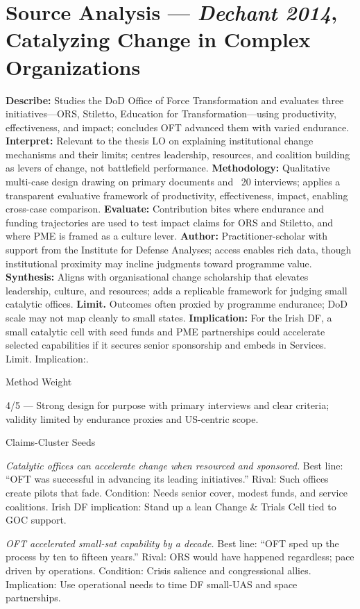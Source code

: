 \section*{Source Analysis — \textit{Dechant 2014}, Catalyzing Change in Complex Organizations}
\textbf{Describe:} Studies the DoD Office of Force Transformation and evaluates three initiatives—ORS, Stiletto, Education for Transformation—using productivity, effectiveness, and impact; concludes OFT advanced them with varied endurance.
\textbf{Interpret:} Relevant to the thesis LO on explaining institutional change mechanisms and their limits; centres leadership, resources, and coalition building as levers of change, not battlefield performance.
\textbf{Methodology:} Qualitative multi-case design drawing on primary documents and ~20 interviews; applies a transparent evaluative framework of productivity, effectiveness, impact, enabling cross-case comparison.
\textbf{Evaluate:} Contribution bites where endurance and funding trajectories are used to test impact claims for ORS and Stiletto, and where PME is framed as a culture lever.
\textbf{Author:} Practitioner-scholar with support from the Institute for Defense Analyses; access enables rich data, though institutional proximity may incline judgments toward programme value.
\textbf{Synthesis:} Aligns with organisational change scholarship that elevates leadership, culture, and resources; adds a replicable framework for judging small catalytic offices.
\textbf{Limit.} Outcomes often proxied by programme endurance; DoD scale may not map cleanly to small states.
\textbf{Implication:} For the Irish DF, a small catalytic cell with seed funds and PME partnerships could accelerate selected capabilities if it secures senior sponsorship and embeds in Services. Limit. Implication:.

Method Weight

4/5 — Strong design for purpose with primary interviews and clear criteria; validity limited by endurance proxies and US-centric scope.

Claims-Cluster Seeds

\textit{Catalytic offices can accelerate change when resourced and sponsored.} Best line: “OFT was successful in advancing its leading initiatives.” Rival: Such offices create pilots that fade. Condition: Needs senior cover, modest funds, and service coalitions. Irish DF implication: Stand up a lean Change & Trials Cell tied to GOC support.

\textit{OFT accelerated small-sat capability by a decade.} Best line: “OFT sped up the process by ten to fifteen years.” Rival: ORS would have happened regardless; pace driven by operations. Condition: Crisis salience and congressional allies. Implication: Use operational needs to time DF small-UAS and space partnerships.

